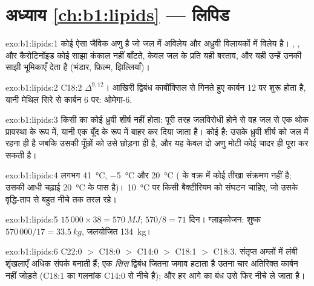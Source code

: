 \section*{अध्याय \ref{ch:b1:lipids} --- लिपिड}

\begin{solution}{exo:b1:lipids:1}
कोई  ऐसा जैविक अणु है जो जल में अविलेय और अध्रुवी विलायकों में विलेय
है। , ,  और कैरोटिनॉइड कोई साझा
कंकाल नहीं बाँटते, केवल जल के प्रति यही बरताव, और यही उन्हें उनकी साझी
भूमिकाएँ देता है (भंडार, फ़िल्म, झिल्लियाँ)।
\end{solution}

\begin{solution}{exo:b1:lipids:2}
C18:2 $\Delta^{9,12}$। आखिरी द्विबंध कार्बॉक्सिल से गिनते हुए कार्बन 12
पर शुरू होता है, यानी मेथिल सिरे से कार्बन 6 पर: ओमेगा-6.
\end{solution}

\begin{solution}{exo:b1:lipids:3}
किसी  का कोई ध्रुवी शीर्ष नहीं होता: पूरी तरह जलविरोधी
होने से वह जल से एक थोक प्रावस्था के रूप में, यानी एक बूँद के रूप में बाहर
कर दिया जाता है। कोई   है: उसके ध्रुवी शीर्ष को जल में
रहना ही है जबकि उसकी पूँछों को उसे छोड़ना ही है, और यह केवल दो अणु मोटी
कोई चादर ही पूरा कर सकती है।
\end{solution}

\begin{solution}{exo:b1:lipids:4}
लगभग \qty{41}{\celsius}, \qty{-5}{\celsius} और \qty{20}{\celsius}
( के वक्र में कोई तीखा संक्रमण नहीं है; उसकी आधी चढ़ाई
\qty{20}{\celsius} के पास है)। \qty{10}{\celsius} पर किसी बैक्टीरियम को
 संघटन चाहिए, जो उसके वृद्धि-ताप से बहुत नीचे तक तरल रहे।
\end{solution}

\begin{solution}{exo:b1:lipids:5}
$15\,000\times 38 = \qty{570}{MJ}$; $570/8 = 71$ दिन। ग्लाइकोजन: शुष्क
$570\,000/17 = \qty{33.5}{kg}$, जलयोजित \qty{134}{kg}।
\end{solution}

\begin{solution}{exo:b1:lipids:6}
C22:0 $>$ C18:0 $>$ C14:0 $>$ C18:1 $>$ C18:3. संतृप्त अम्लों में
लंबी शृंखलाएँ अधिक  संपर्क बनाती हैं; एक \emph{सिस} द्विबंध
जितना जमाव हटाता है उतना चार अतिरिक्त कार्बन नहीं जोड़ते (C18:1 का गलनांक
C14:0 से नीचे है); और हर आगे का बंध उसे फिर नीचे ले जाता है।
\end{solution}

